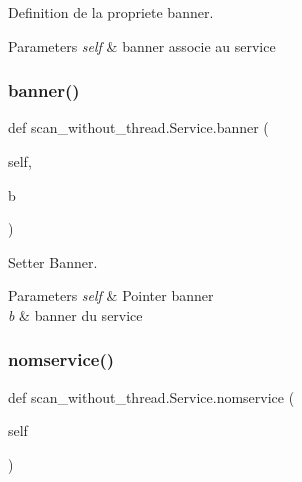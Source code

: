 Definition de la propriete banner. 


\begin{DoxyParams}{Parameters}
{\em self} & banner associe au service \\
\hline
\end{DoxyParams}
\hypertarget{classscan__without__thread_1_1Service_a06943e06602290a600477dd191c0af9c}{}\label{classscan__without__thread_1_1Service_a06943e06602290a600477dd191c0af9c} 
\subsubsection{\texorpdfstring{banner()}{banner()}\hspace{0.1cm}{\footnotesize\ttfamily [2/2]}}
{\footnotesize\ttfamily def scan\+\_\+without\+\_\+thread.\+Service.\+banner (\begin{DoxyParamCaption}\item[{}]{self,  }\item[{}]{b }\end{DoxyParamCaption})}



Setter Banner. 


\begin{DoxyParams}{Parameters}
{\em self} & Pointer banner \\
\hline
{\em b} & banner du service \\
\hline
\end{DoxyParams}
\hypertarget{classscan__without__thread_1_1Service_a73dd1605ff43abe5d14fff3721007c81}{}\label{classscan__without__thread_1_1Service_a73dd1605ff43abe5d14fff3721007c81} 
\subsubsection{\texorpdfstring{nomservice()}{nomservice()}\hspace{0.1cm}{\footnotesize\ttfamily [1/2]}}
{\footnotesize\ttfamily def scan\+\_\+without\+\_\+thread.\+Service.\+nomservice (\begin{DoxyParamCaption}\item[{}]{self }\end{DoxyParamCaption})}



